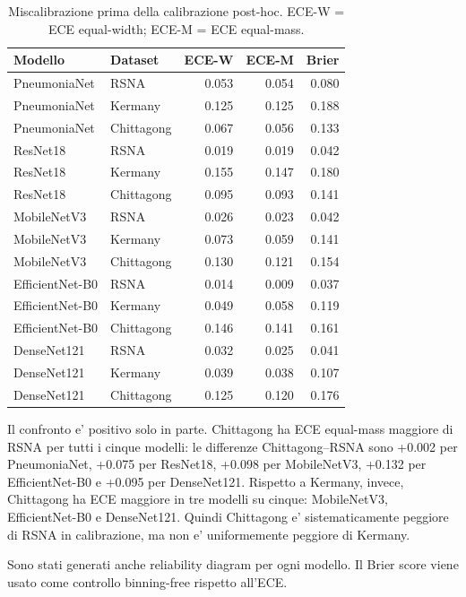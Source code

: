 \documentclass[11pt,a4paper]{article}
\begin{document}
\begin{table}[H]
\centering
\caption{Miscalibrazione prima della calibrazione post-hoc. ECE-W = ECE equal-width; ECE-M = ECE equal-mass.}
\label{tab:calibration-ece}
\small
\begin{tabular}{llrrr}
\toprule
Modello & Dataset & ECE-W & ECE-M & Brier \\
\midrule
PneumoniaNet & RSNA & 0.053 & 0.054 & 0.080 \\
PneumoniaNet & Kermany & 0.125 & 0.125 & 0.188 \\
PneumoniaNet & Chittagong & 0.067 & 0.056 & 0.133 \\
ResNet18 & RSNA & 0.019 & 0.019 & 0.042 \\
ResNet18 & Kermany & 0.155 & 0.147 & 0.180 \\
ResNet18 & Chittagong & 0.095 & 0.093 & 0.141 \\
MobileNetV3 & RSNA & 0.026 & 0.023 & 0.042 \\
MobileNetV3 & Kermany & 0.073 & 0.059 & 0.141 \\
MobileNetV3 & Chittagong & 0.130 & 0.121 & 0.154 \\
EfficientNet-B0 & RSNA & 0.014 & 0.009 & 0.037 \\
EfficientNet-B0 & Kermany & 0.049 & 0.058 & 0.119 \\
EfficientNet-B0 & Chittagong & 0.146 & 0.141 & 0.161 \\
DenseNet121 & RSNA & 0.032 & 0.025 & 0.041 \\
DenseNet121 & Kermany & 0.039 & 0.038 & 0.107 \\
DenseNet121 & Chittagong & 0.125 & 0.120 & 0.176 \\
\bottomrule
\end{tabular}
\normalsize
\end{table}

Il confronto e' positivo solo in parte. Chittagong ha ECE equal-mass maggiore di
RSNA per tutti i cinque modelli:
le differenze Chittagong--RSNA sono +0.002 per PneumoniaNet, +0.075 per
ResNet18, +0.098 per MobileNetV3, +0.132 per EfficientNet-B0 e +0.095 per
DenseNet121. Rispetto a Kermany, invece, Chittagong ha ECE maggiore in tre
modelli su cinque: MobileNetV3, EfficientNet-B0 e DenseNet121. Quindi
Chittagong e' sistematicamente peggiore di RSNA in calibrazione, ma non e'
uniformemente peggiore di Kermany.

Sono stati generati anche reliability diagram per ogni modello. Il Brier score
viene usato come controllo binning-free rispetto all'ECE.
\end{document}
